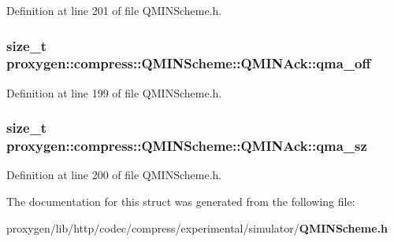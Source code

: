 Definition at line 201 of file Q\+M\+I\+N\+Scheme.\+h.

\subsubsection[{qma\+\_\+off}]{\setlength{\rightskip}{0pt plus 5cm}size\+\_\+t proxygen\+::compress\+::\+Q\+M\+I\+N\+Scheme\+::\+Q\+M\+I\+N\+Ack\+::qma\+\_\+off}\label{structproxygen_1_1compress_1_1QMINScheme_1_1QMINAck_ab2fedcbdeb00bae2ca44b72890e49de9}


Definition at line 199 of file Q\+M\+I\+N\+Scheme.\+h.

\subsubsection[{qma\+\_\+sz}]{\setlength{\rightskip}{0pt plus 5cm}size\+\_\+t proxygen\+::compress\+::\+Q\+M\+I\+N\+Scheme\+::\+Q\+M\+I\+N\+Ack\+::qma\+\_\+sz}\label{structproxygen_1_1compress_1_1QMINScheme_1_1QMINAck_adacf1a9684b8c826c3ff66645e15013f}


Definition at line 200 of file Q\+M\+I\+N\+Scheme.\+h.



The documentation for this struct was generated from the following file\+:\begin{DoxyCompactItemize}
\item 
proxygen/lib/http/codec/compress/experimental/simulator/{\bf Q\+M\+I\+N\+Scheme.\+h}\end{DoxyCompactItemize}

